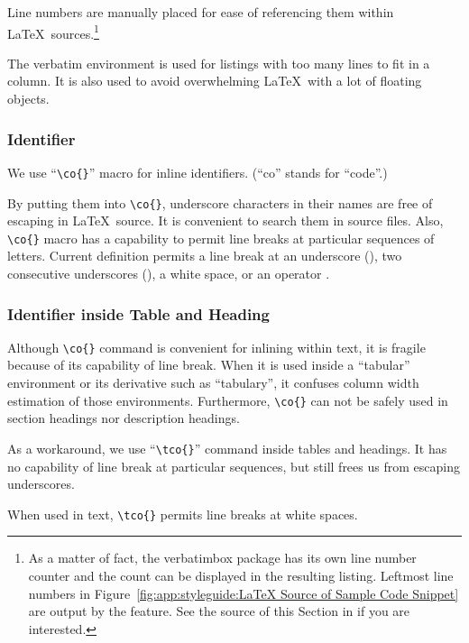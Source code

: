 Line numbers are manually placed for ease of referencing them within
\LaTeX\ sources.\footnote{
  As a matter of fact, the verbatimbox package has its own line
  number counter and the count can be displayed in the resulting
  listing. Leftmost line numbers in
  Figure~\ref{fig:app:styleguide:LaTeX Source of Sample Code Snippet}
  are output by the feature. See the source of this Section
  in 
  if you are interested.}

The verbatim environment is used for listings with too many lines
to fit in a column. It is also used to avoid overwhelming
\LaTeX\ with a lot of floating objects.

\subsubsection{Identifier}
\label{sec:app:styleguide:Identifier}

We use ``\verb|\co{}|'' macro for inline identifiers.
(``co'' stands for ``code''.)

By putting them into \verb|\co{}|, underscore characters in
their names are free of escaping in \LaTeX\ source. It is convenient
to search them in source files. Also, \verb|\co{}|
macro has a capability to permit line breaks at particular
sequences of letters. Current definition permits a line break at
an underscore (\tco{_}), two consecutive underscores (\tco{__}),
a white space, or an operator \tco{->}.

\subsubsection{Identifier inside Table and Heading}
\label{sec:app:styleguide:Identifier inside Table and Heading}

Although \verb|\co{}| command is convenient for inlining within text,
it is fragile because of its capability of line break.
When it is used inside a ``tabular'' environment or its derivative
such as ``tabulary'', it confuses column width
estimation of those environments.
Furthermore, \verb|\co{}| can not be safely used in section headings nor
description headings.

As a workaround, we use ``\verb|\tco{}|'' command
inside tables and headings. It has no capability of line break
at particular sequences, but still frees us from escaping
underscores.

When used in text, \verb|\tco{}| permits line breaks at
white spaces.

